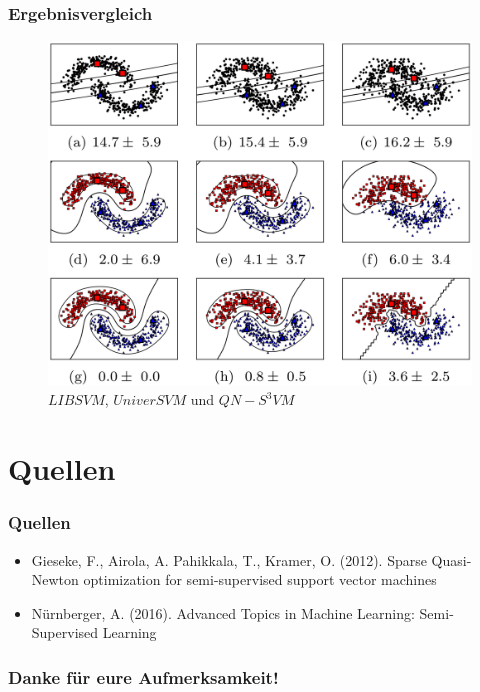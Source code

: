 \documentclass{beamer}
\begin{document}
\begin{frame}
	\frametitle{Ergebnisvergleich}
	\begin{figure}
	\includegraphics[width=\linewidth,height=.7\textheight,keepaspectratio]{img/example_results.png}
    \caption{$LIBSVM$, $UniverSVM$ und $QN-S^3VM$}
	
	\end{figure}
\end{frame}


\section{Quellen}

\begin{frame}
\frametitle{Quellen}
\begin{itemize}
\item Gieseke, F., Airola, A. Pahikkala, T., Kramer, O. (2012). Sparse Quasi-Newton optimization for semi-supervised support vector machines
\item N\"urnberger, A. (2016). Advanced Topics in Machine Learning: Semi-Supervised Learning
\end{itemize}
\end{frame}


\begin{frame}
\frametitle{Danke f\"ur eure Aufmerksamkeit!}
\end{frame}
\end{document}
